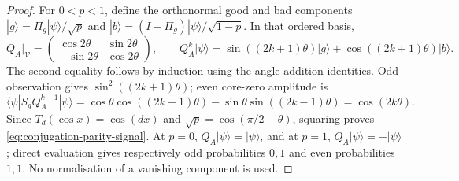 \begin{proof}
For $0<p<1$, define the orthonormal good and bad components
$|g\rangle=\Pi_g|\psi\rangle/\sqrt p$ and
$|b\rangle=(I-\Pi_g)|\psi\rangle/\sqrt{1-p}$. In that ordered basis,
\begin{equation}
 Q_A\big|_{\mathcal V}
 =\begin{pmatrix}\cos2\theta&\sin2\theta\\
                 -\sin2\theta&\cos2\theta\end{pmatrix},
 \qquad
 Q_A^k|\psi\rangle
 =\sin((2k+1)\theta)|g\rangle+
   \cos((2k+1)\theta)|b\rangle.
 \label{eq:conjugation-grover-matrix}
\end{equation}
The second equality follows by induction using the angle-addition
identities. Odd observation gives $\sin^2((2k+1)\theta)$; even
core-zero amplitude is
\begin{equation}
 \langle\psi|S_g Q_A^{k-1}|\psi\rangle
 =\cos\theta\cos((2k-1)\theta)
  -\sin\theta\sin((2k-1)\theta)
 =\cos(2k\theta).
 \label{eq:conjugation-even-amplitude}
\end{equation}
Since $T_d(\cos x)=\cos(dx)$ and
$\sqrt p=\cos(\pi/2-\theta)$, squaring proves
\eqref{eq:conjugation-parity-signal}. At $p=0$, $Q_A|\psi\rangle
=|\psi\rangle$, and at $p=1$, $Q_A|\psi\rangle=-|\psi\rangle$;
direct evaluation gives respectively odd probabilities $0,1$ and
even probabilities $1,1$. No normalisation of a vanishing component
is used.


\end{proof}
